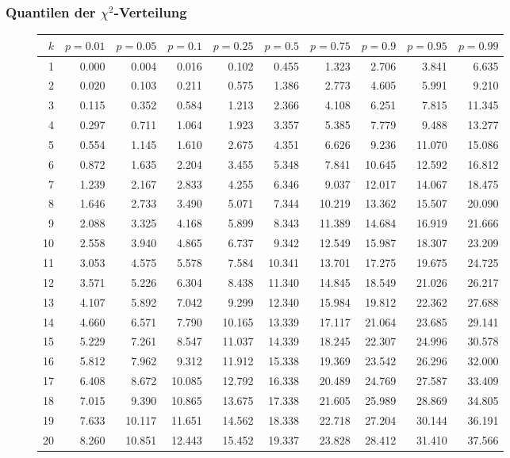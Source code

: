 \subsubsection{Quantilen der $\chi^2$-Verteilung}
\begin{figure}[h!]
\begin{center}
\scriptsize
\begin{tabular}{|r|rrr|rrr|rrr|}
\hline
\strut$k$&$p=0.01$&$p=0.05$&$p=0.1$&$p=0.25$&$p=0.5$&$p=0.75$&$p=0.9$&$p=0.95$&$p=0.99$\\
\hline
1&0.000&0.004&0.016&0.102&0.455&1.323&2.706&3.841&6.635\\
2&0.020&0.103&0.211&0.575&1.386&2.773&4.605&5.991&9.210\\
3&0.115&0.352&0.584&1.213&2.366&4.108&6.251&7.815&11.345\\
4&0.297&0.711&1.064&1.923&3.357&5.385&7.779&9.488&13.277\\
5&0.554&1.145&1.610&2.675&4.351&6.626&9.236&11.070&15.086\\
6&0.872&1.635&2.204&3.455&5.348&7.841&10.645&12.592&16.812\\
7&1.239&2.167&2.833&4.255&6.346&9.037&12.017&14.067&18.475\\
8&1.646&2.733&3.490&5.071&7.344&10.219&13.362&15.507&20.090\\
9&2.088&3.325&4.168&5.899&8.343&11.389&14.684&16.919&21.666\\
10&2.558&3.940&4.865&6.737&9.342&12.549&15.987&18.307&23.209\\
11&3.053&4.575&5.578&7.584&10.341&13.701&17.275&19.675&24.725\\
12&3.571&5.226&6.304&8.438&11.340&14.845&18.549&21.026&26.217\\
13&4.107&5.892&7.042&9.299&12.340&15.984&19.812&22.362&27.688\\
14&4.660&6.571&7.790&10.165&13.339&17.117&21.064&23.685&29.141\\
15&5.229&7.261&8.547&11.037&14.339&18.245&22.307&24.996&30.578\\
16&5.812&7.962&9.312&11.912&15.338&19.369&23.542&26.296&32.000\\
17&6.408&8.672&10.085&12.792&16.338&20.489&24.769&27.587&33.409\\
18&7.015&9.390&10.865&13.675&17.338&21.605&25.989&28.869&34.805\\
19&7.633&10.117&11.651&14.562&18.338&22.718&27.204&30.144&36.191\\
20&8.260&10.851&12.443&15.452&19.337&23.828&28.412&31.410&37.566\\

\end{tabular}
\end{center}
\end{figure}
